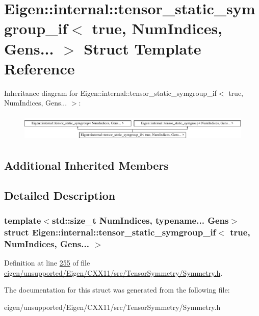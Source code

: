 \hypertarget{struct_eigen_1_1internal_1_1tensor__static__symgroup__if_3_01true_00_01_num_indices_00_01_gens_8_8_8_01_4}{}\section{Eigen\+:\+:internal\+:\+:tensor\+\_\+static\+\_\+symgroup\+\_\+if$<$ true, Num\+Indices, Gens... $>$ Struct Template Reference}
\label{struct_eigen_1_1internal_1_1tensor__static__symgroup__if_3_01true_00_01_num_indices_00_01_gens_8_8_8_01_4}
Inheritance diagram for Eigen\+:\+:internal\+:\+:tensor\+\_\+static\+\_\+symgroup\+\_\+if$<$ true, Num\+Indices, Gens... $>$\+:\begin{figure}[H]
\begin{center}
\leavevmode
\includegraphics[height=1.323877cm]{struct_eigen_1_1internal_1_1tensor__static__symgroup__if_3_01true_00_01_num_indices_00_01_gens_8_8_8_01_4}
\end{center}
\end{figure}
\subsection*{Additional Inherited Members}


\subsection{Detailed Description}
\subsubsection*{template$<$std\+::size\+\_\+t Num\+Indices, typename... Gens$>$\newline
struct Eigen\+::internal\+::tensor\+\_\+static\+\_\+symgroup\+\_\+if$<$ true, Num\+Indices, Gens... $>$}



Definition at line \hyperlink{eigen_2unsupported_2_eigen_2_c_x_x11_2src_2_tensor_symmetry_2_symmetry_8h_source_l00255}{255} of file \hyperlink{eigen_2unsupported_2_eigen_2_c_x_x11_2src_2_tensor_symmetry_2_symmetry_8h_source}{eigen/unsupported/\+Eigen/\+C\+X\+X11/src/\+Tensor\+Symmetry/\+Symmetry.\+h}.



The documentation for this struct was generated from the following file\+:\begin{DoxyCompactItemize}
\item 
eigen/unsupported/\+Eigen/\+C\+X\+X11/src/\+Tensor\+Symmetry/\+Symmetry.\+h\end{DoxyCompactItemize}
